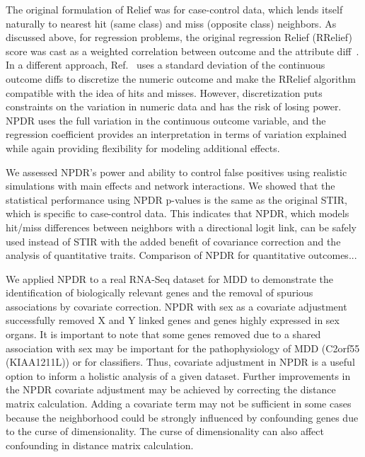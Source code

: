 \documentclass[10pt]{article}
\begin{document}
The original formulation of Relief was for case-control data, which lends itself naturally to nearest hit (same class) and miss (opposite class) neighbors. As discussed above, for regression problems, the original regression Relief (RRelief) score was cast as a weighted correlation between outcome and the attribute diff~\cite{robnik03}. In a different approach, Ref.~\cite{urbanowicz17} uses a standard deviation of the continuous outcome diffs to discretize the numeric outcome and make the RRelief algorithm compatible with the idea of hits and misses. However, discretization puts constraints on the variation in numeric data and has the risk of losing power. NPDR uses the full variation in the continuous outcome variable, and the regression coefficient provides an interpretation in terms of variation explained while again providing flexibility for modeling additional effects. 

We assessed NPDR's power and ability to control false positives using realistic simulations with main effects and network interactions. We showed that the statistical performance using NPDR p-values is the same as the original STIR, which is specific to case-control data. This indicates that NPDR, which models hit/miss differences between neighbors with a directional logit link, can be safely used instead of STIR with the added benefit of covariance correction and the analysis of quantitative traits. Comparison of NPDR for quantitative outcomes... 

We applied NPDR to a real RNA-Seq dataset for MDD to demonstrate the identification of biologically relevant genes and the removal of spurious associations by covariate correction. NPDR with sex as a covariate adjustment successfully removed X and Y linked genes and genes highly expressed in sex organs. It is important to note that some genes removed due to a shared association with sex may be important for the pathophysiology of MDD (C2orf55 (KIAA1211L)) or for classifiers.  Thus, covariate adjustment in NPDR is a useful option to inform a holistic analysis of a given dataset. Further improvements in the NPDR covariate adjustment may be achieved by correcting the distance matrix calculation. Adding a covariate term may not be sufficient in some cases because the neighborhood could be strongly influenced by confounding genes due to the curse of dimensionality. The curse of dimensionality can also affect confounding in distance matrix calculation.

\end{document}
